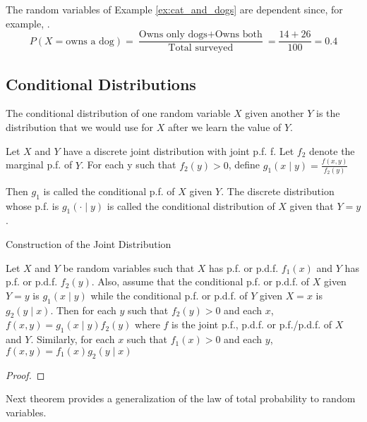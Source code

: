 \begin{example}
The random variables of Example \ref{ex:cat_and_dogs} are dependent since, for example, .
\[
P(X=\text{owns a dog}) = \frac{\text{Owns only dogs} + \text{Owns both}}{\text{Total surveyed}} = \frac{14 + 26}{100} = 0.4
\]
\end{example}


\subsection{Conditional Distributions}

{\color{red} The conditional distribution of one random variable $X$ given another $Y$ is the distribution that we would use for $X$ after we learn the value of $Y$.}

\begin{definition}
Let $X$ and $Y$ have a discrete joint distribution with joint p.f. f. Let $f_{2}$ denote the marginal p.f. of $Y$. For each y such that $f_{2}\left(y\right)>0$, define $g_{1}\left(x\mid y\right)=\frac{f\left(x,y\right)}{f_{2}\left(y\right)}$
\end{definition}

{\color{red} Then $g_{1}$ is called the conditional p.f. of $X$ given $Y$. The discrete distribution whose p.f. is $g_{1}\left(\cdot\mid y\right)$ is called the conditional distribution of $X$ given that $Y=y$.}

{\color{red} Construction of the Joint Distribution}

\begin{proposition}
Let $X$ and $Y$ be random variables such that $X$ has p.f. or p.d.f. $f_{1}\left(x\right)$ and $Y$ has p.f. or p.d.f. $f_{2}\left(y\right)$. Also, assume that the conditional p.f. or p.d.f. of $X$ given $Y=y$ is $g_{1}\left(x\mid y\right)$ while the conditional p.f. or p.d.f. of $Y$ given $X=x$ is $g_{2}\left(y\mid x\right)$. Then for each $y$ such that $f_{2}\left(y\right)>0$ and each $x$, $f\left(x,y\right)=g_{1}\left(x\mid y\right)f_{2}\left(y\right)$ where $f$ is the joint p.f., p.d.f. or p.f./p.d.f. of $X$ and $Y$. Similarly, for each $x$ such that $f_{1}\left(x\right)>0$ and each $y$, $f\left(x,y\right)=f_{1}\left(x\right)g_{2}\left(y\mid x\right)$
\end{proposition}
\begin{proof}
\end{proof}

{\color{red} Next theorem provides a generalization of the law of total probability to random variables.}

